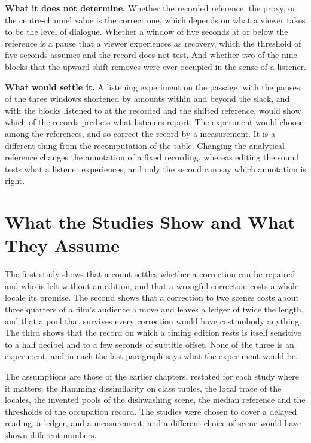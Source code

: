 \documentclass[11pt,twoside,openright]{book}
\theoremstyle{plain}
\theoremstyle{definition}
\theoremstyle{remark}
\begin{document}
\textbf{What it does not determine.} Whether the recorded reference, the proxy, or the centre-channel value is the correct one, which depends on what a viewer takes to be the level of dialogue. Whether a window of five seconds at or below the reference is a pause that a viewer experiences as recovery, which the threshold of five seconds assumes and the record does not test. And whether two of the nine blocks that the upward shift removes were ever occupied in the sense of a listener.

\textbf{What would settle it.} A listening experiment on the passage, with the pauses of the three windows shortened by amounts within and beyond the slack, and with the blocks listened to at the recorded and the shifted reference, would show which of the records predicts what listeners report. The experiment would choose among the references, and so correct the record by a measurement. It is a different thing from the recomputation of the table. Changing the analytical reference changes the annotation of a fixed recording, whereas editing the sound tests what a listener experiences, and only the second can say which annotation is right.

\section{What the Studies Show and What They Assume}\label{sec:limits17}

The first study shows that a count settles whether a correction can be repaired and who is left without an edition, and that a wrongful correction costs a whole locale its promise. The second shows that a correction to two scenes costs about three quarters of a film's audience a move and leaves a ledger of twice the length, and that a pool that survives every correction would have cost nobody anything. The third shows that the record on which a timing edition rests is itself sensitive to a half decibel and to a few seconds of subtitle offset. None of the three is an experiment, and in each the last paragraph says what the experiment would be.

The assumptions are those of the earlier chapters, restated for each study where it matters: the Hamming dissimilarity on class tuples, the local trace of the locales, the invented pools of the dishwashing scene, the median reference and the thresholds of the occupation record. The studies were chosen to cover a delayed reading, a ledger, and a measurement, and a different choice of scene would have shown different numbers.
\end{document}
